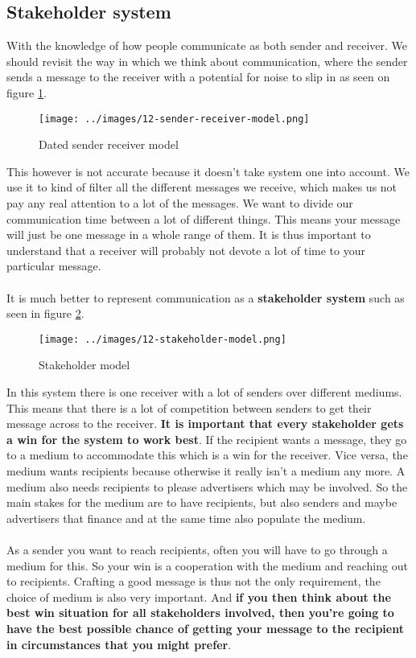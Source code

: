 \documentclass[../summary.tex]{subfiles}
\begin{document}
\subsection{Stakeholder system}
With the knowledge of how people communicate as both sender and receiver. We should revisit the way in which we think about communication, where the sender sends a message to the receiver with a potential for noise to slip in as seen on figure \ref{fig:sender-receiver-model}.
\\
\begin{figure}[h]
	\centering
	\texttt{[image: ../images/12-sender-receiver-model.png]}
	\caption{Dated sender receiver model}
	\label{fig:sender-receiver-model}
\end{figure}
This however is not accurate because it doesn't take system one into account. We use it to kind of filter all the different messages we receive, which makes us not pay any real attention to a lot of the messages. We want to divide our communication time between a lot of different things. This means your message will just be one message in a whole range of them. It is thus important to understand that a receiver will probably not devote a lot of time to your particular message.
\\\\
It is much better to represent communication as a \textbf{stakeholder system} such as seen in figure \ref{fig:stakeholder-model}.
\\
\begin{figure}[h]
	\centering
	\texttt{[image: ../images/12-stakeholder-model.png]}
	\caption{Stakeholder model}
	\label{fig:stakeholder-model}
\end{figure}
\newpage
In this system there is one receiver with a lot of senders over different mediums. This means that there is a lot of competition between senders to get their message across to the receiver. \textbf{It is important that every stakeholder gets a win for the system to work best}. If the recipient wants a message, they go to a medium to accommodate this which is a win for the receiver. Vice versa, the medium wants recipients because otherwise it really isn't a medium any more. A medium also needs recipients to please advertisers which may be involved. So the main stakes for the medium are to have recipients, but also senders and maybe advertisers that finance and at the same time also populate the medium.
\\\\
As a sender you want to reach recipients, often you will have to go through a medium for this. So your win is a cooperation with the medium and reaching out to recipients. Crafting a good message is thus not the only requirement, the choice of medium is also very important. And \textbf{if you then think about the best win situation for all stakeholders involved, then you're going to have the best possible chance of getting your message to the recipient in circumstances that you might prefer}.
\end{document}
